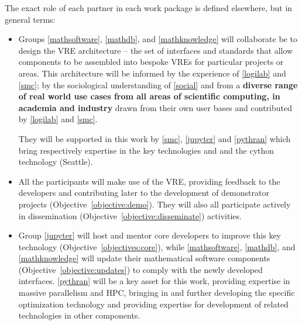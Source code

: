 \documentclass[noworkareas,deliverables,\classoptions]{euproposal}       %
\begin{document}
\begin{proposal}

The exact role of each partner in each work package is defined
elsewhere, but in general terms:
\begin{itemize}
\item Groups \ref{mathsoftware}, \ref{mathdb}, and
\ref{mathknowledge} will collaborate be to design the \TheProject VRE
architecture -- the set of interfaces and standards that allow
components to be assembled into bespoke VREs for particular projects
or areas. This architecture will be informed  by the
experience of \ref{logilab} and \ref{smc}; by the sociological
understanding of \ref{social} and from a 
\textbf{diverse range of real world use cases from all areas of scientific
  computing, in academia and industry} drawn from their own user bases
and contributed by \ref{logilab} and \ref{smc}.

They will be supported in this work by \ref{smc}, \ref{jupyter} and \ref{pythran} which
bring respectively expertise in the key technologies \SMC and \Jupyter and the cython
technology (Seattle).

\item All the participants will make use of the \TheProject VRE, providing feedback to the
  developers and contributing later to the development of demonstrator projects
  (Objective~\ref{objective:demo}). They will also all participate actively in
  dissemination (Objective~\ref{objective:disseminate}) activities.

\item Group \ref{jupyter} will host and mentor core \Jupyter developers to improve this
  key technology (Objective~\ref{objectives:core}), while \ref{mathsoftware},
  \ref{mathdb}, and \ref{mathknowledge} will update their mathematical software components
  (Objective~\ref{objective:updates}) to comply with the newly developed
  interfaces. \ref{pythran} will be a key asset for this work, providing expertise in
  massive parallelism and HPC, bringing in and further developing the specific \Pythran
  optimization technology and providing expertise for development of related technologies
  in other components.  


\end{itemize}
\end{proposal}
\end{document}
